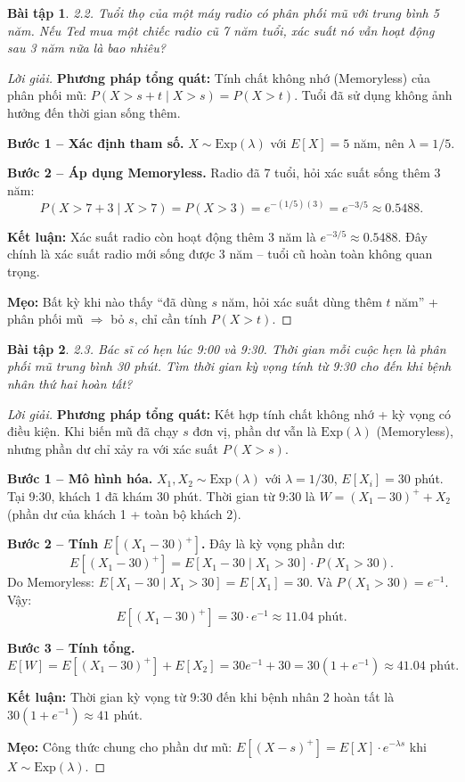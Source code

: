\documentclass[8pt,a4paper]{article}
\newtheorem{exercise}{Bài tập}
\newenvironment{solution}{\begin{proof}[Lời giải]}{\end{proof}}
\begin{document}
\begin{exercise}
2.2. Tuổi thọ của một máy radio có phân phối mũ với trung bình 5 năm. Nếu Ted mua một chiếc radio cũ 7 năm tuổi, xác suất nó vẫn hoạt động sau 3 năm nữa là bao nhiêu?
\end{exercise}
\begin{solution}
\textbf{Phương pháp tổng quát:} Tính chất không nhớ (Memoryless) của phân phối mũ: $P(X > s+t \mid X > s) = P(X > t)$. Tuổi đã sử dụng không ảnh hưởng đến thời gian sống thêm.

\textbf{Bước 1 -- Xác định tham số.} $X \sim \text{Exp}(\lambda)$ với $E[X] = 5$ năm, nên $\lambda = 1/5$.

\textbf{Bước 2 -- Áp dụng Memoryless.} Radio đã 7 tuổi, hỏi xác suất sống thêm 3 năm:
\[
  P(X > 7+3 \mid X > 7) = P(X > 3) = e^{-(1/5)(3)} = \boxed{e^{-3/5} \approx 0.5488}.
\]

\textbf{Kết luận:} Xác suất radio còn hoạt động thêm 3 năm là $e^{-3/5} \approx 0.5488$. Đây chính là xác suất radio mới sống được 3 năm -- tuổi cũ hoàn toàn không quan trọng.

\textbf{Mẹo:} Bất kỳ khi nào thấy ``đã dùng $s$ năm, hỏi xác suất dùng thêm $t$ năm'' + phân phối mũ $\Rightarrow$ bỏ $s$, chỉ cần tính $P(X > t)$.
\end{solution}

\begin{exercise}
2.3. Bác sĩ có hẹn lúc 9:00 và 9:30. Thời gian mỗi cuộc hẹn là phân phối mũ trung bình 30 phút. Tìm thời gian kỳ vọng tính từ 9:30 cho đến khi bệnh nhân thứ hai hoàn tất?
\end{exercise}
\begin{solution}
\textbf{Phương pháp tổng quát:} Kết hợp tính chất không nhớ + kỳ vọng có điều kiện. Khi biến mũ đã chạy $s$ đơn vị, phần dư vẫn là $\text{Exp}(\lambda)$ (Memoryless), nhưng phần dư chỉ xảy ra với xác suất $P(X > s)$.

\textbf{Bước 1 -- Mô hình hóa.} $X_1, X_2 \sim \text{Exp}(\lambda)$ với $\lambda = 1/30$, $E[X_i] = 30$ phút. Tại 9:30, khách 1 đã khám 30 phút. Thời gian từ 9:30 là $W = (X_1 - 30)^+ + X_2$ (phần dư của khách 1 + toàn bộ khách 2).

\textbf{Bước 2 -- Tính $E[(X_1 - 30)^+]$.} Đây là kỳ vọng phần dư:
\[
  E[(X_1 - 30)^+] = E[X_1 - 30 \mid X_1 > 30] \cdot P(X_1 > 30).
\]
Do Memoryless: $E[X_1 - 30 \mid X_1 > 30] = E[X_1] = 30$. Và $P(X_1 > 30) = e^{-1}$. Vậy:
\[
  E[(X_1 - 30)^+] = 30 \cdot e^{-1} \approx 11.04 \text{ phút}.
\]

\textbf{Bước 3 -- Tính tổng.}
\[
  E[W] = E[(X_1 - 30)^+] + E[X_2] = 30e^{-1} + 30 = \boxed{30(1 + e^{-1}) \approx 41.04 \text{ phút}}.
\]

\textbf{Kết luận:} Thời gian kỳ vọng từ 9:30 đến khi bệnh nhân 2 hoàn tất là $30(1+e^{-1}) \approx 41$ phút.

\textbf{Mẹo:} Công thức chung cho phần dư mũ: $E[(X-s)^+] = E[X] \cdot e^{-\lambda s}$ khi $X \sim \text{Exp}(\lambda)$.
\end{solution}
\end{document}
